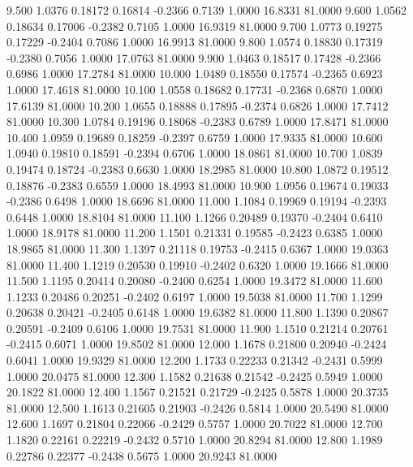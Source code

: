    9.500   1.0376   0.18172   0.16814  -0.2366   0.7139   1.0000  16.8331  81.0000
   9.600   1.0562   0.18634   0.17006  -0.2382   0.7105   1.0000  16.9319  81.0000
   9.700   1.0773   0.19275   0.17229  -0.2404   0.7086   1.0000  16.9913  81.0000
   9.800   1.0574   0.18830   0.17319  -0.2380   0.7056   1.0000  17.0763  81.0000
   9.900   1.0463   0.18517   0.17428  -0.2366   0.6986   1.0000  17.2784  81.0000
  10.000   1.0489   0.18550   0.17574  -0.2365   0.6923   1.0000  17.4618  81.0000
  10.100   1.0558   0.18682   0.17731  -0.2368   0.6870   1.0000  17.6139  81.0000
  10.200   1.0655   0.18888   0.17895  -0.2374   0.6826   1.0000  17.7412  81.0000
  10.300   1.0784   0.19196   0.18068  -0.2383   0.6789   1.0000  17.8471  81.0000
  10.400   1.0959   0.19689   0.18259  -0.2397   0.6759   1.0000  17.9335  81.0000
  10.600   1.0940   0.19810   0.18591  -0.2394   0.6706   1.0000  18.0861  81.0000
  10.700   1.0839   0.19474   0.18724  -0.2383   0.6630   1.0000  18.2985  81.0000
  10.800   1.0872   0.19512   0.18876  -0.2383   0.6559   1.0000  18.4993  81.0000
  10.900   1.0956   0.19674   0.19033  -0.2386   0.6498   1.0000  18.6696  81.0000
  11.000   1.1084   0.19969   0.19194  -0.2393   0.6448   1.0000  18.8104  81.0000
  11.100   1.1266   0.20489   0.19370  -0.2404   0.6410   1.0000  18.9178  81.0000
  11.200   1.1501   0.21331   0.19585  -0.2423   0.6385   1.0000  18.9865  81.0000
  11.300   1.1397   0.21118   0.19753  -0.2415   0.6367   1.0000  19.0363  81.0000
  11.400   1.1219   0.20530   0.19910  -0.2402   0.6320   1.0000  19.1666  81.0000
  11.500   1.1195   0.20414   0.20080  -0.2400   0.6254   1.0000  19.3472  81.0000
  11.600   1.1233   0.20486   0.20251  -0.2402   0.6197   1.0000  19.5038  81.0000
  11.700   1.1299   0.20638   0.20421  -0.2405   0.6148   1.0000  19.6382  81.0000
  11.800   1.1390   0.20867   0.20591  -0.2409   0.6106   1.0000  19.7531  81.0000
  11.900   1.1510   0.21214   0.20761  -0.2415   0.6071   1.0000  19.8502  81.0000
  12.000   1.1678   0.21800   0.20940  -0.2424   0.6041   1.0000  19.9329  81.0000
  12.200   1.1733   0.22233   0.21342  -0.2431   0.5999   1.0000  20.0475  81.0000
  12.300   1.1582   0.21638   0.21542  -0.2425   0.5949   1.0000  20.1822  81.0000
  12.400   1.1567   0.21521   0.21729  -0.2425   0.5878   1.0000  20.3735  81.0000
  12.500   1.1613   0.21605   0.21903  -0.2426   0.5814   1.0000  20.5490  81.0000
  12.600   1.1697   0.21804   0.22066  -0.2429   0.5757   1.0000  20.7022  81.0000
  12.700   1.1820   0.22161   0.22219  -0.2432   0.5710   1.0000  20.8294  81.0000
  12.800   1.1989   0.22786   0.22377  -0.2438   0.5675   1.0000  20.9243  81.0000

